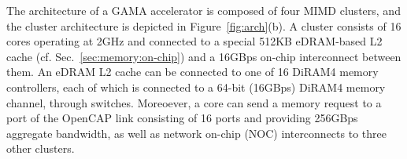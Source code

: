 

The architecture of a GAMA accelerator is composed of four MIMD clusters, and the cluster architecture is depicted in Figure~\ref{fig:arch}(b).
A cluster consists of 16 cores operating at 2GHz and connected to a special 512KB eDRAM-based L2 cache (cf. Sec.~\ref{sec:memory:on-chip}) and a 16GBps on-chip interconnect between them. 
An eDRAM L2 cache can be connected to one of 16 DiRAM4 memory controllers, each of which is connected to a 64-bit (16GBps) DiRAM4 memory channel, through switches.
Moreoever, a core can send a memory request to a port of the OpenCAP link consisting of 16 ports and providing 256GBps aggregate bandwidth, as well as network on-chip (NOC) interconnects to three other clusters.  


\begin{comment}
\noindent
\textbf{Coarse-Grained Reconfigurable Processing Engine:} 
To efficiently execute graph primitives, we aim to architect the CGR-Core with a coarse-grain reconfigurable (CGR) array of execution units. 
This architecture based on a spatial data-flow architecture can significantly reduce the overhead of instruction fetches and data transfers within an accelerator, as many operations for a complex graph primitive function can be executed by a single (macro) instruction and a few registerfile and/or cache accesses. 
Furthermore, for streaming graph analytics, it is very inefficient to apply computations and changes to individual vertices as they arrive. 
We propose the update buffer to allow CGR-Core to bulk commit messages bound for (or coming from) multiple vertices in a single phase.
\end{comment}



